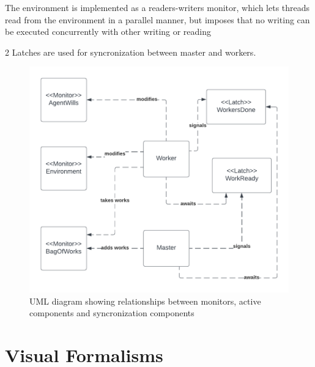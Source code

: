 \documentclass[12pt, a4paper]{report}
\begin{document}
The environment is implemented as a readers-writers monitor, which
 lets threads read from the environment in a parallel manner, but imposes
 that no writing can be executed concurrently with other writing or reading

2 Latches are used for syncronization between master and workers.

\begin{figure}
    \centering
    \includegraphics{UML1.png}
    \caption{UML diagram showing relationships between monitors, active components and syncronization components}
\end{figure}

\section{Visual Formalisms}
\end{document}
